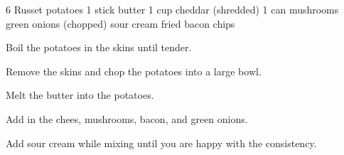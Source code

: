 \dishtype{\side}
\begin{ingreds}
    6 Russet potatoes
    1 stick butter
    1 cup cheddar (shredded)
    1 can mushrooms
    green onions (chopped)
    sour cream
    fried bacon chips
\end{ingreds}
\begin{method}
    Boil the potatoes in the skins until tender.\par
    Remove the skins and chop the potatoes into a large bowl.\par
    Melt the butter into the potatoes.\par
    Add in the chees, mushrooms, bacon, and green onions.\par
    Add sour cream while mixing until you are happy with the consistency.
\end{method}